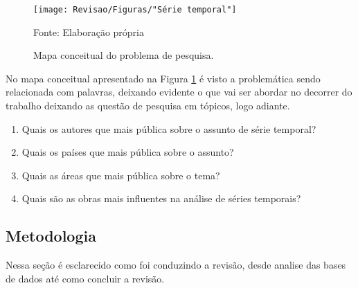 \begin{figure}[H]
	\centering
	\caption{Mapa conceitual do problema de pesquisa.}
	\label{fig:serie-temporal}
	\texttt{[image: Revisao/Figuras/"Série temporal"]}
	
	Fonte: Elaboração própria 
\end{figure}

No mapa conceitual apresentado na Figura \ref{fig:serie-temporal} é visto a problemática sendo relacionada com palavras, deixando evidente o que vai ser abordar no decorrer do trabalho deixando as questão de pesquisa em tópicos, logo adiante.

\begin{enumerate}[start=1, label = {\textbf{Q} \arabic* } ]
	\item \label{questão:rev1}Quais os autores que mais pública sobre o assunto de série temporal?
	\item \label{questão:rev2}Quais os países que mais pública sobre o assunto? 
	\item \label{questão:rev3}Quais as áreas que mais pública sobre o tema?
	\item \label{questão:rev4}Quais são as obras mais influentes na análise de séries temporais?
\end{enumerate}

\subsection{Metodologia}\label{subsec:met da revisão}

Nessa seção é esclarecido como foi conduzindo a revisão, desde analise das bases de dados até como concluir a revisão.

